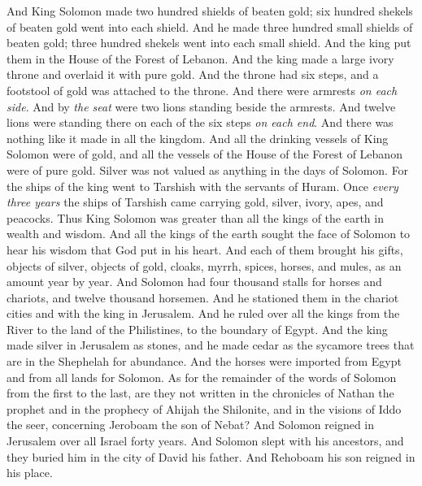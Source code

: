 \begin{biblechapter}
\verse And King Solomon made two hundred shields of beaten gold; six hundred shekels of beaten gold went into each shield.
\verse And he made three hundred small shields of beaten gold; three hundred shekels went into each small shield. And the king put them in the House of the Forest of Lebanon.
\verse And the king made a large ivory throne and overlaid it with pure gold.
\verse And the throne had six steps, and a footstool of gold was attached to the throne. And there were armrests \textit{on each side}. And by \textit{the seat} were two lions standing beside the armrests.
\verse And twelve lions were standing there on each of the six steps \textit{on each end}. And there was nothing like it made in all the kingdom.
\verse And all the drinking vessels of King Solomon were of gold, and all the vessels of the House of the Forest of Lebanon were of pure gold. Silver was not valued as anything in the days of Solomon.
\verse For the ships of the king went to Tarshish with the servants of Huram. Once \textit{every three years} the ships of Tarshish came carrying gold, silver, ivory, apes, and peacocks.
\verse Thus King Solomon was greater than all the kings of the earth in wealth and wisdom.
\verse And all the kings of the earth sought the face of Solomon to hear his wisdom that God put in his heart.
\verse And each of them brought his gifts, objects of silver, objects of gold, cloaks, myrrh, spices, horses, and mules, as an amount year by year.
\verse And Solomon had four thousand stalls for horses and chariots, and twelve thousand horsemen. And he stationed them in the chariot cities and with the king in Jerusalem.
\verse And he ruled over all the kings from the River to the land of the Philistines, to the boundary of Egypt.
\verse And the king made silver in Jerusalem as stones, and he made cedar as the sycamore trees that are in the Shephelah for abundance.
\verse And the horses were imported from Egypt and from all lands for Solomon.
 As for the remainder of the words of Solomon from the first to the last, are they not written in the chronicles of Nathan the prophet and in the prophecy of Ahijah the Shilonite, and in the visions of Iddo the seer, concerning Jeroboam the son of Nebat?
\verse And Solomon reigned in Jerusalem over all Israel forty years.
\verse And Solomon slept with his ancestors, and they buried him in the city of David his father. And Rehoboam his son reigned in his place.
\end{biblechapter}


